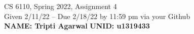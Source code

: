 \documentclass[11pt]{article}
\begin{document}

\newlength{\minpagw}
\settowidth{\minpagw}{\hspace{40em}}

\begin{center}
\begin{large}
  CS 6110, Spring 2022, Assignment 4  \\
  Given 2/11/22 -- Due 2/18/22 by 11:59 pm via your Github 
  \ \\
    {  {\Large\bf NAME: Tripti Agarwal } \hfill {\Large\bf UNID: u1319433}\hspace{4cm} }
          \ \\
\end{large}

\end{center}
\end{document}
